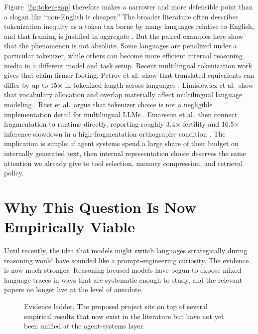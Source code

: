 \documentclass[11pt]{article}
\begin{document}
Figure~\ref{fig:token-gap} therefore makes a narrower and more defensible point than a slogan like ``non-English is cheaper.'' The broader literature often describes tokenization inequity as a token tax borne by many languages relative to English, and that framing is justified in aggregate \cite{petrov2023unfairness}. But the paired examples here show that the phenomenon is not absolute. Some languages are penalized under a particular tokenizer, while others can become more efficient internal reasoning media in a different model and task setup. Recent multilingual tokenization work gives that claim firmer footing. Petrov et al.\ show that translated equivalents can differ by up to 15$\times$ in tokenized length across languages \cite{petrov2023unfairness}. Limisiewicz et al.\ show that vocabulary allocation and overlap materially affect multilingual language modeling \cite{limisiewicz2023tokenization}. Rust et al.\ argue that tokenizer choice is not a negligible implementation detail for multilingual LLMs \cite{rust2023tokenizer}. Einarsson et al.\ then connect fragmentation to runtime directly, reporting roughly 3.4$\times$ fertility and 16.5$\times$ inference slowdown in a high-fragmentation orthography condition \cite{einarsson2026scripttax}. The implication is simple: if agent systems spend a large share of their budget on internally generated text, then internal representation choice deserves the same attention we already give to tool selection, memory compression, and retrieval policy.

\section{Why This Question Is Now Empirically Viable}

Until recently, the idea that models might switch languages strategically during reasoning would have sounded like a prompt-engineering curiosity. The evidence is now much stronger. Reasoning-focused models have begun to expose mixed-language traces in ways that are systematic enough to study, and the relevant papers no longer live at the level of anecdote.

\begin{figure}[t]
\centering
{}
\caption{Evidence ladder. The proposed project sits on top of several empirical results that now exist in the literature but have not yet been unified at the agent-systems layer.}
\label{fig:evidence-ladder}
\end{figure}
\end{document}
